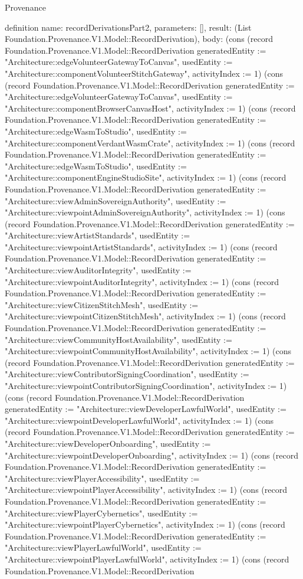 \begin{lexlean}{Provenance}
\begin{semanticmodule}
definition{
  name: recordDerivationsPart2,
  parameters: [],
  result: (List Foundation.Provenance.V1.Model::RecordDerivation),
  body: (cons (record Foundation.Provenance.V1.Model::RecordDerivation {generatedEntity := "Architecture::edgeVolunteerGatewayToCanvas", usedEntity := "Architecture::componentVolunteerStitchGateway", activityIndex := 1}) (cons (record Foundation.Provenance.V1.Model::RecordDerivation {generatedEntity := "Architecture::edgeVolunteerGatewayToCanvas", usedEntity := "Architecture::componentBrowserCanvasHost", activityIndex := 1}) (cons (record Foundation.Provenance.V1.Model::RecordDerivation {generatedEntity := "Architecture::edgeWasmToStudio", usedEntity := "Architecture::componentVerdantWasmCrate", activityIndex := 1}) (cons (record Foundation.Provenance.V1.Model::RecordDerivation {generatedEntity := "Architecture::edgeWasmToStudio", usedEntity := "Architecture::componentEngineStudioSite", activityIndex := 1}) (cons (record Foundation.Provenance.V1.Model::RecordDerivation {generatedEntity := "Architecture::viewAdminSovereignAuthority", usedEntity := "Architecture::viewpointAdminSovereignAuthority", activityIndex := 1}) (cons (record Foundation.Provenance.V1.Model::RecordDerivation {generatedEntity := "Architecture::viewArtistStandards", usedEntity := "Architecture::viewpointArtistStandards", activityIndex := 1}) (cons (record Foundation.Provenance.V1.Model::RecordDerivation {generatedEntity := "Architecture::viewAuditorIntegrity", usedEntity := "Architecture::viewpointAuditorIntegrity", activityIndex := 1}) (cons (record Foundation.Provenance.V1.Model::RecordDerivation {generatedEntity := "Architecture::viewCitizenStitchMesh", usedEntity := "Architecture::viewpointCitizenStitchMesh", activityIndex := 1}) (cons (record Foundation.Provenance.V1.Model::RecordDerivation {generatedEntity := "Architecture::viewCommunityHostAvailability", usedEntity := "Architecture::viewpointCommunityHostAvailability", activityIndex := 1}) (cons (record Foundation.Provenance.V1.Model::RecordDerivation {generatedEntity := "Architecture::viewContributorSigningCoordination", usedEntity := "Architecture::viewpointContributorSigningCoordination", activityIndex := 1}) (cons (record Foundation.Provenance.V1.Model::RecordDerivation {generatedEntity := "Architecture::viewDeveloperLawfulWorld", usedEntity := "Architecture::viewpointDeveloperLawfulWorld", activityIndex := 1}) (cons (record Foundation.Provenance.V1.Model::RecordDerivation {generatedEntity := "Architecture::viewDeveloperOnboarding", usedEntity := "Architecture::viewpointDeveloperOnboarding", activityIndex := 1}) (cons (record Foundation.Provenance.V1.Model::RecordDerivation {generatedEntity := "Architecture::viewPlayerAccessibility", usedEntity := "Architecture::viewpointPlayerAccessibility", activityIndex := 1}) (cons (record Foundation.Provenance.V1.Model::RecordDerivation {generatedEntity := "Architecture::viewPlayerCybernetics", usedEntity := "Architecture::viewpointPlayerCybernetics", activityIndex := 1}) (cons (record Foundation.Provenance.V1.Model::RecordDerivation {generatedEntity := "Architecture::viewPlayerLawfulWorld", usedEntity := "Architecture::viewpointPlayerLawfulWorld", activityIndex := 1}) (cons (record Foundation.Provenance.V1.Model::RecordDerivation }
\end{semanticmodule}
\end{lexlean}
